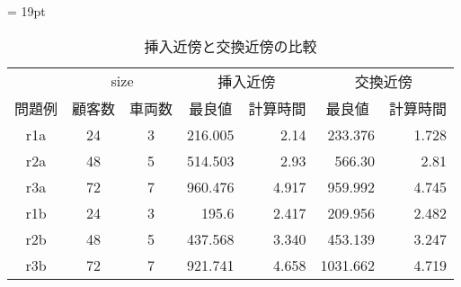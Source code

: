 \begin{table}[]
  \tabcolsep = 19pt
  \renewcommand{\arraystretch}{0.8}
  \caption{挿入近傍と交換近傍の比較}
  \label{table1}
\begin{tabular}{ccccrcr}
\hline
    & \multicolumn{2}{c}{size} & \multicolumn{2}{c}{挿入近傍}                          & \multicolumn{2}{c}{交換近傍}                         \\ \cline{2-7}
問題例 & 顧客数           &  車両数          & 最良値                      & \multicolumn{1}{c}{計算時間} & 最良値                      & \multicolumn{1}{c}{計算時間} \\ \cline{2-7}
r1a & 24          & 3          & \multicolumn{1}{r}{216.005} & 2.14                     & \multicolumn{1}{r}{233.376} & 1.728                    \\
r2a & 48          & 5          & \multicolumn{1}{r}{514.503}  & 2.93                      & \multicolumn{1}{r}{566.30}  & 2.81                     \\
r3a & 72         & 7          & \multicolumn{1}{r}{960.476} & 4.917                     & \multicolumn{1}{r}{959.992} & 4.745                   \\
r1b & 24          & 3          & \multicolumn{1}{r}{195.6} & 2.417                     & \multicolumn{1}{r}{209.956} & 2.482                     \\
r2b & 48          & 5          & \multicolumn{1}{r}{437.568} & 3.340                     & \multicolumn{1}{r}{453.139} & 3.247                     \\
r3b & 72         & 7          & \multicolumn{1}{r}{921.741} & 4.658                   & \multicolumn{1}{r}{1031.662} & 4.719                 \\
\hline
\end{tabular}
\end{table}




